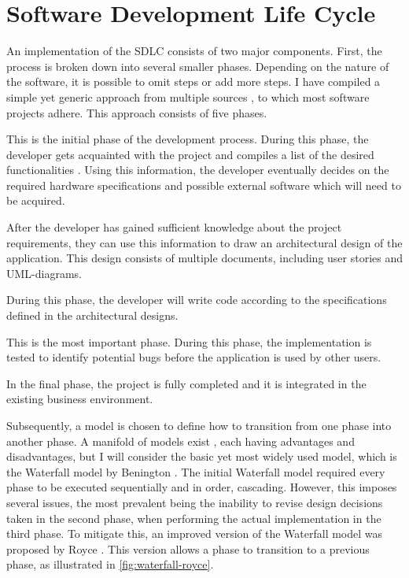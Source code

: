 
\section{Software Development Life Cycle}\label{sec:se-sdlc}
An implementation of the SDLC consists of two major components. First, the process is broken down into several smaller phases. Depending on the nature of the software, it is possible to omit steps or add more steps. I have compiled a simple yet generic approach from multiple sources \cite{2010govardhan, 7106435}, to which most software projects adhere. This approach consists of five phases.
\begin{enumerate}
	 This is the initial phase of the development process. During this phase, the developer gets acquainted with the project and compiles a list of the desired functionalities \cite{7106435}. Using this information, the developer eventually decides on the required hardware specifications and possible external software which will need to be acquired.
	
	 After the developer has gained sufficient knowledge about the project requirements, they can use this information to draw an architectural design of the application. This design consists of multiple documents, including user stories and UML-diagrams.
	
	 During this phase, the developer will write code according to the specifications defined in the architectural designs.
	
	 This is the most important phase. During this phase, the implementation is tested to identify potential bugs before the application is used by other users.
	
	 In the final phase, the project is fully completed and it is integrated in the existing business environment.
\end{enumerate}

\noindent Subsequently, a model is chosen to define how to transition from one phase into another phase. A manifold of models exist \cite{2010govardhan}, each having advantages and disadvantages, but I will consider the basic yet most widely used model, which is the Waterfall model by Benington \cite{united1956symposium}. The initial Waterfall model required every phase to be executed sequentially and in order, cascading. However, this imposes several issues, the most prevalent being the inability to revise design decisions taken in the second phase, when performing the actual implementation in the third phase. To mitigate this, an improved version of the Waterfall model was proposed by Royce \cite{Royce:1987:MDL:41765.41801}. This version allows a phase to transition to a previous phase, as illustrated in \autoref{fig:waterfall-royce}.

